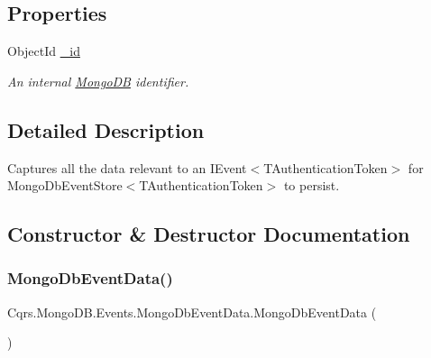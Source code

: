 \subsection*{Properties}
\begin{DoxyCompactItemize}
\item 
Object\+Id \hyperlink{classCqrs_1_1MongoDB_1_1Events_1_1MongoDbEventData_a5650b3e9bac3dd255e8267394e67749a_a5650b3e9bac3dd255e8267394e67749a}{\+\_\+id}
\begin{DoxyCompactList}\small\item\em An internal \hyperlink{namespaceCqrs_1_1MongoDB}{Mongo\+DB} identifier. \end{DoxyCompactList}\end{DoxyCompactItemize}


\subsection{Detailed Description}
Captures all the data relevant to an I\+Event$<$\+T\+Authentication\+Token$>$ for Mongo\+Db\+Event\+Store$<$\+T\+Authentication\+Token$>$ to persist. 



\subsection{Constructor \& Destructor Documentation}
\mbox{\label{classCqrs_1_1MongoDB_1_1Events_1_1MongoDbEventData_a3e0d14163cbc3e11505d63b15ddd1337_a3e0d14163cbc3e11505d63b15ddd1337}} 
\subsubsection{\texorpdfstring{Mongo\+Db\+Event\+Data()}{MongoDbEventData()}\hspace{0.1cm}{\footnotesize\ttfamily [1/2]}}
{\footnotesize\ttfamily Cqrs.\+Mongo\+D\+B.\+Events.\+Mongo\+Db\+Event\+Data.\+Mongo\+Db\+Event\+Data (\begin{DoxyParamCaption}{ }\end{DoxyParamCaption})}



